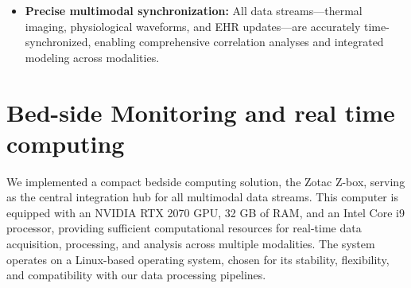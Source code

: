 \begin{itemize}
\begin{itemize}
          \item \textit{IT and security constraints:} Operation within the isolated hospital network (no internet), NTP-based internal time synchronization, role-based access, audit logs, and read-only EHR interfaces follow least-privilege principles. Such measures directly address clinicians' concerns about data security and trust, ensuring safe and reliable system deployment \citep{aldosari2025cybersecurity}.

          \item \textit{Workflow simplicity:} One-click start/stop, clear status indicators, and remote support reduce cognitive load for clinical staff. Auto focus and distance compensation (Section~\ref{sec:shape-through-focus}) remove manual focusing, and automated data integration eliminates the need for manual data export, aligning with ICU staff’s desire for highly usable systems \citep{ede2021non}.

          \item \textit{Staff expectations for future systems:} ICU staff explicitly expressed a preference for noninvasive, interoperable sensors and mobile monitoring tools. Our non-contact TVI approach and reuse of existing monitors for WAVE acquisition directly address these stated needs \citep{ede2021non}.
        \end{itemize}

  \item \textbf{Precise multimodal synchronization:} All data streams—thermal imaging, physiological waveforms, and EHR updates—are accurately time-synchronized, enabling comprehensive correlation analyses and integrated modeling across modalities.
\end{itemize}

\section{Bed-side Monitoring and real time computing}
\label{sec:bed-side-monitoring}
We implemented a compact bedside computing solution, the Zotac Z-box, serving as the central integration hub for all multimodal data streams. This computer is equipped with an NVIDIA RTX 2070 GPU, 32 GB of RAM, and an Intel Core i9 processor, providing sufficient computational resources for real-time data acquisition, processing, and analysis across multiple modalities. The system operates on a Linux-based operating system, chosen for its stability, flexibility, and compatibility with our data processing pipelines.

